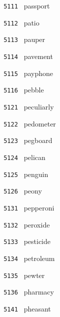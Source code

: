 \documentclass[11pt]{article}
\begin{document}
\begin{multicols}{6}
\small
\noindent \texttt{ 5111 } \hspace{1mm} passport  \par
\noindent \texttt{ 5112 } \hspace{1mm} patio  \par
\noindent \texttt{ 5113 } \hspace{1mm} pauper  \par
\noindent \texttt{ 5114 } \hspace{1mm} pavement  \par
\noindent \texttt{ 5115 } \hspace{1mm} payphone  \par
\noindent \texttt{ 5116 } \hspace{1mm} pebble  \par
\noindent \texttt{ 5121 } \hspace{1mm} peculiarly  \par
\noindent \texttt{ 5122 } \hspace{1mm} pedometer  \par
\noindent \texttt{ 5123 } \hspace{1mm} pegboard  \par
\noindent \texttt{ 5124 } \hspace{1mm} pelican  \par
\noindent \texttt{ 5125 } \hspace{1mm} penguin  \par
\noindent \texttt{ 5126 } \hspace{1mm} peony  \par
\noindent \texttt{ 5131 } \hspace{1mm} pepperoni  \par
\noindent \texttt{ 5132 } \hspace{1mm} peroxide  \par
\noindent \texttt{ 5133 } \hspace{1mm} pesticide  \par
\noindent \texttt{ 5134 } \hspace{1mm} petroleum  \par
\noindent \texttt{ 5135 } \hspace{1mm} pewter  \par
\noindent \texttt{ 5136 } \hspace{1mm} pharmacy  \par
\noindent \texttt{ 5141 } \hspace{1mm} pheasant  \par

\end{multicols}
\end{document}
